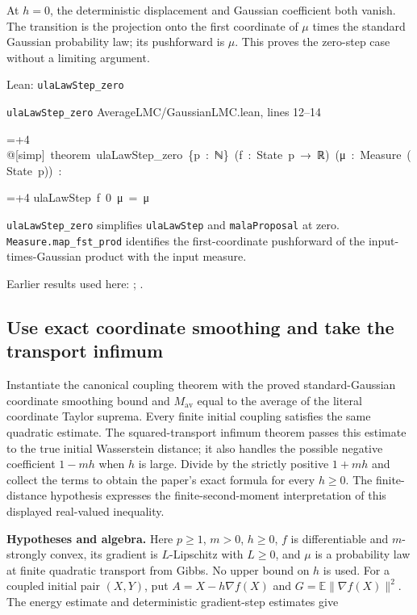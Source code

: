 \documentclass[11pt,a4paper]{report}
\newlength{\leancharwidth}
\newenvironment{leancode}{\par\smallskip\begingroup\ttfamily\footnotesize\raggedright
  \settowidth{\leancharwidth}{M}\setlength{\parskip}{0pt}\setlength{\parindent}{0pt}
  \frenchspacing}{\par\endgroup\smallskip}
\newcommand{\leanline}[2]{\hangindent=\dimexpr#1\leancharwidth+4\leancharwidth\relax
  \hangafter=1\noindent\hspace*{#1\leancharwidth}#2\par}
\newcommand{\leansource}[1]{\par{\footnotesize\color{leanmuted}#1}\par}
\newcommand{\leanlabel}[1]{\par\smallskip\noindent{\small\bfseries #1}\par}
\begin{document}
At \(h=0\), the deterministic displacement and Gaussian coefficient both vanish. The transition is the projection onto the first coordinate of \(\mu\) times the standard Gaussian probability law; its pushforward is \(\mu\). This proves the zero-step case without a limiting argument.

\begin{leanbox}{Lean: \texttt{ulaLawStep\_\allowbreak{}zero}}
\leansource{\texttt{ulaLawStep\_\allowbreak{}zero} \quad AverageLMC/\allowbreak{}GaussianLMC.lean, lines 12–14}
\begin{leancode}
\leanline{0}{@[simp]\ theorem\ ulaLawStep\_zero\ \{p\ :\ ℕ\}\ (f\ :\ State\ p\ →\ ℝ)\ (μ\ :\ Measure\ (State\ p))\ :}
\leanline{4}{ulaLawStep\ f\ 0\ μ\ =\ μ}
\end{leancode}
\leanlabel{How the Lean proof follows the argument}
\texttt{ula\allowbreak{}Law\allowbreak{}Step\_\allowbreak{}zero} simplifies \texttt{ula\allowbreak{}Law\allowbreak{}Step} and \texttt{mala\allowbreak{}Proposal} at zero. \texttt{Measure.\allowbreak{}map\_\allowbreak{}fst\_\allowbreak{}prod} identifies the first-coordinate pushforward of the input-times-Gaussian product with the input measure.
\end{leanbox}


Earlier results used here: \cite[Section~3.34.1]{LangevinLean2026ULASC}; \cite[Section~3.36.7]{LangevinLean2026ULASC}.
\subsection{\texorpdfstring{Use exact coordinate smoothing and take the transport infimum}{Use exact coordinate smoothing and take the transport infimum}}
\label{report-step-AverageLMC-GaussianLMC-lean-2}


Instantiate the canonical coupling theorem with the proved standard-Gaussian coordinate smoothing bound and \(M_{\mathrm{av}}\) equal to the average of the literal coordinate Taylor suprema. Every finite initial coupling satisfies the same quadratic estimate. The squared-transport infimum theorem passes this estimate to the true initial Wasserstein distance; it also handles the possible negative coefficient \(1-mh\) when \(h\) is large. Divide by the strictly positive \(1+mh\) and collect the terms to obtain the paper’s exact formula for every \(h\ge 0\). The finite-distance hypothesis expresses the finite-second-moment interpretation of this displayed real-valued inequality.




\textbf{Hypotheses and algebra.} Here \(p\ge1\), \(m>0\), \(h\ge0\), \(f\) is differentiable and \(m\)-strongly convex, its gradient is \(L\)-Lipschitz with \(L\ge0\), and \(\mu\) is a probability law at finite quadratic transport from Gibbs. No upper bound on \(h\) is used. For a coupled initial pair \((X,Y)\), put \(A=X-h\nabla f(X)\) and \(G=\mathbb E\|\nabla f(X)\|^2\). The energy estimate and deterministic gradient-step estimates give
\end{document}
